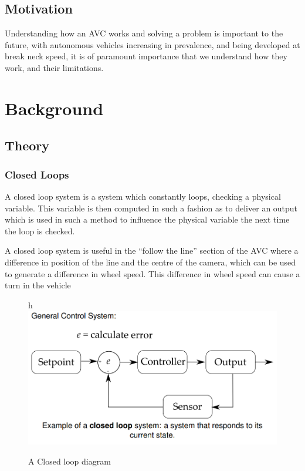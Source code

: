 \documentclass[paper=a4, fontsize=11pt]{scrartcl} %
\numberwithin{equation}{section} %
\numberwithin{figure}{section} %
\begin{document}
\subsection{Motivation}
Understanding how an AVC works and solving a problem is important to the future,
with autonomous vehicles increasing in prevalence, and being developed at break
neck speed, it is of paramount importance that we understand how they work, and
their limitations.








\section{Background}
\subsection{Theory}
\subsubsection{Closed Loops}
A closed loop system is a system which constantly loops, checking a physical
variable. This variable is then computed in such a fashion as to deliver an
output which is used in such a method to influence the physical variable the
next time the loop is checked.\autocite{elfClosedLoops}

A closed loop system is useful in the ``follow the line'' section of the AVC
where a difference in position of the line and the centre of the camera, which
can be used to generate a difference in wheel speed. This difference in wheel
speed can cause a turn in the vehicle

\begin{figure}{h}
\includegraphics[width=\textwidth]{closedloop}
\centering
\caption{A Closed loop diagram \autocite{elfClosedLoops}}
\end{figure}
\end{document}

